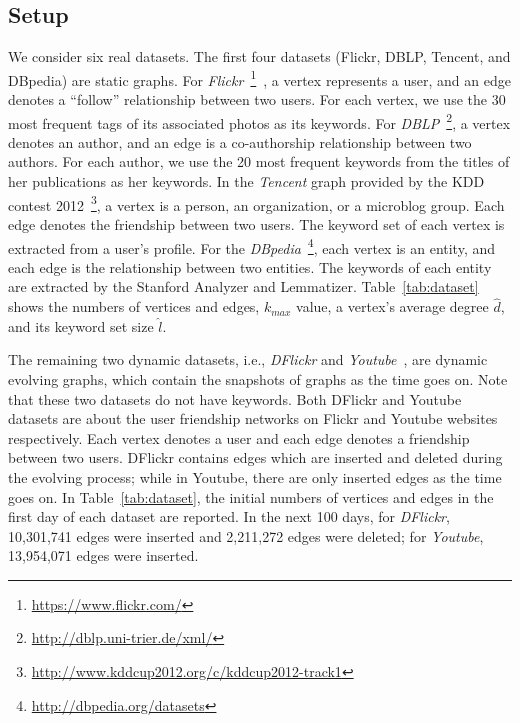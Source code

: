 \subsection{Setup}
\label{setup}

We consider six real datasets. The first four datasets (Flickr, DBLP, Tencent, and DBpedia) are static graphs.
For {\it Flickr}~\footnote{\url{https://www.flickr.com/}}~\cite{thomee2015new}, a vertex represents a user, and an edge denotes a ``follow'' relationship between two users. For each vertex, we use the 30 most frequent tags of its associated photos as its keywords.
For {\it DBLP}~\footnote{\url{http://dblp.uni-trier.de/xml/}}, a vertex denotes an author, and an edge is a co-authorship relationship between two authors.
For each author, we use the 20 most frequent keywords from the titles of her publications as her keywords.
In the {\it Tencent} graph provided by the KDD contest 2012~\footnote{\url{http://www.kddcup2012.org/c/kddcup2012-track1}}, a vertex is a person, an organization, or a microblog group. Each edge denotes the friendship between two users. The keyword set of each vertex is extracted from a user's profile. For the {\it DBpedia}~\footnote{\url{http://dbpedia.org/datasets}}, each vertex is an entity, and each edge is the relationship between two entities. The keywords of each entity are extracted by the Stanford Analyzer and Lemmatizer.
Table~\ref{tab:dataset} shows the numbers of vertices and edges, $k_{max}$ value, a vertex's average degree $\widehat d$, and its keyword set size $\widehat l$.

{\color{blue}
The remaining two dynamic datasets,
i.e., {\it DFlickr} and {\it Youtube}~\cite{mislove-2009-socialnetworksthesis,mislove-2008-flickr},
are dynamic evolving graphs, which contain the snapshots of graphs as the time goes on.
Note that these two datasets do not have keywords.
Both DFlickr and Youtube datasets are about the user friendship networks on Flickr and Youtube websites respectively.
Each vertex denotes a user and each edge denotes a friendship between two users.
DFlickr contains edges which are inserted and deleted during the evolving process;
while in Youtube, there are only inserted edges as the time goes on.
In Table~\ref{tab:dataset}, the initial numbers of vertices and edges in the first day of each dataset are reported. In the next 100 days, for {\it DFlickr}, 10,301,741 edges were inserted and 2,211,272 edges were deleted; for {\it Youtube}, 13,954,071 edges were inserted.
}

